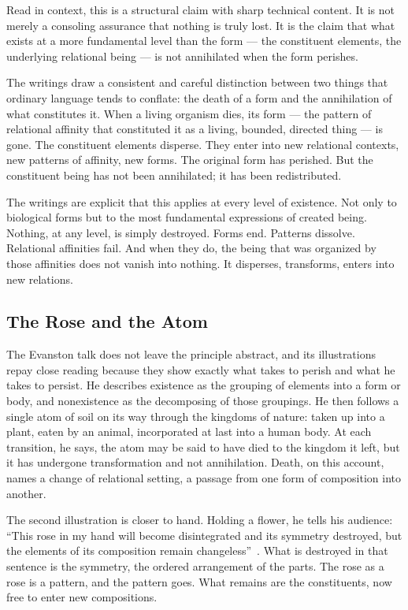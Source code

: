 Read in context, this is a structural claim with sharp technical content.
It is not merely a consoling assurance that nothing is truly lost.
It is the claim that what exists at a more fundamental level than the form --- the constituent elements, the underlying relational being --- is not annihilated when the form perishes.

The \bahai writings draw a consistent and careful distinction between two things that ordinary language tends to conflate: the death of a form and the annihilation of what constitutes it.
When a living organism dies, its form --- the pattern of relational affinity that constituted it as a living, bounded, directed thing --- is gone.
The constituent elements disperse.
They enter into new relational contexts, new patterns of affinity, new forms.
The original form has perished.
But the constituent being has not been annihilated; it has been redistributed.

The writings are explicit that this applies at every level of existence.
Not only to biological forms but to the most fundamental expressions of created being.
Nothing, at any level, is simply destroyed.
Forms end.
Patterns dissolve.
Relational affinities fail.
And when they do, the being that was organized by those affinities does not vanish into nothing.
It disperses, transforms, enters into new relations.

\subsection*{The Rose and the Atom}

The Evanston talk does not leave the principle abstract, and its illustrations repay close reading because they show exactly what \AbdulBaha takes to perish and what he takes to persist.
He describes existence as the grouping of elements into a form or body, and nonexistence as the decomposing of those groupings.
He then follows a single atom of soil on its way through the kingdoms of nature: taken up into a plant, eaten by an animal, incorporated at last into a human body.
At each transition, he says, the atom may be said to have died to the kingdom it left, but it has undergone transformation and not annihilation.
Death, on this account, names a change of relational setting, a passage from one form of composition into another.

The second illustration is closer to hand.
Holding a flower, he tells his audience: ``This rose in my hand will become disintegrated and its symmetry destroyed, but the elements of its composition remain changeless''~\citep[Talk 38]{PUP}.
What is destroyed in that sentence is the symmetry, the ordered arrangement of the parts.
The rose as a rose is a pattern, and the pattern goes.
What remains are the constituents, now free to enter new compositions.

